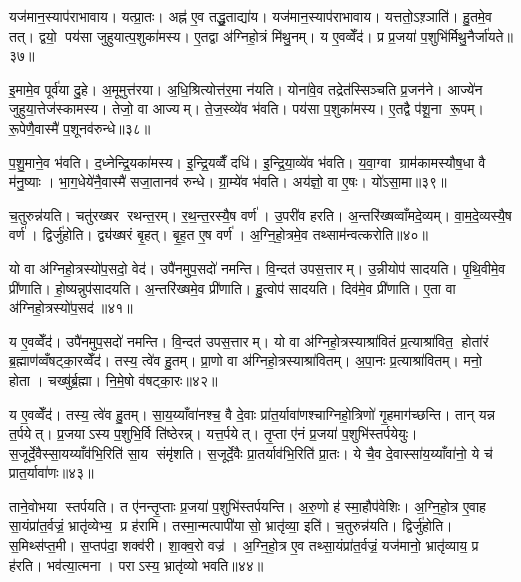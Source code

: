 यज॑मान॒स्याप॑राभावाय। यत्प्रा॒तः। अह्न॑ ए॒व तद्धु॒ताद्या॑य। यज॑मान॒स्याप॑राभावाय। यत्ततो॒ऽश़्ञाति॑। हु॒तमे॒व तत्। द्वयो॒ पय॑सा जुहुयात्प॒शुका॑मस्य। ए॒तद्वा अ॑ग्निहो॒त्रं मि॑थु॒नम्। य ए॒वव्वेँद॑। प्र प्र॒जया॑ प॒शुभि॑र्मिथु॒नैर्जा॑यते॥३७॥

इ॒मामे॒व पूर्व॑या दु॒हे। अ॒मूमुत्त॑रया। अ॒धि॒श्रित्योत्त॑र॒मा न॑यति। योना॑वे॒व तद्रेत॑स्सिञ्चति प्र॒जन॑ने। आज्ये॑न जुहुया॒त्तेज॑स्कामस्य। तेजो॒ वा आज्यम्। ते॒ज॒स्व्ये॑व भ॑वति। पय॑सा प॒शुका॑मस्य। ए॒तद्वै प॑शू॒ना रू॒पम्। रू॒पेणै॒वास्मै॑ प॒शूनव॑रुन्धे॥३८॥

प॒शु॒माने॒व भ॑वति। द॒ध्नेन्द्रि॒यका॑मस्य। इ॒न्द्रि॒यव्वैँ दधि॑। इ॒न्द्रि॒या॒व्ये॑व भ॑वति। य॒वा॒ग्वा ग्राम॑कामस्यौष॒धा वै म॑नु॒ष्याः। भा॒ग॒धेये॑नै॒वास्मै॑ सजा॒तानव॑ रुन्धे। ग्रा॒म्ये॑व भ॑वति। अय॑ज्ञो॒ वा ए॒षः। यो॑ऽसा॒मा॥३९॥

च॒तुरुन्न॑यति। चतु॑रख्षर रथन्त॒रम्। र॒थ॒न्त॒रस्यै॒ष वर्ण॑। उ॒परी॑व हरति। अ॒न्तरि॑ख्षव्वाँमदे॒व्यम्। वा॒म॒दे॒व्यस्यै॒ष वर्ण॑। द्विर्जु॑होति। द्व्य॑ख्षरं बृ॒हत्। बृ॒ह॒त ए॒ष वर्ण॑। अ॒ग्नि॒हो॒त्रमे॒व तथ्साम॑न्वत्करोति॥४०॥

यो वा अ॑ग्निहो॒त्रस्यो॑प॒सदो॒ वेद॑। उपै॑नमुप॒सदो॑ नमन्ति। वि॒न्दत॑ उपस॒त्तारम्। उ॒न्नीयोप॑ सादयति। पृ॒थि॒वीमे॒व प्री॑णाति। हो॒ष्यन्नुप॑सादयति। अ॒न्तरि॑ख्षमे॒व प्री॑णाति। हु॒त्वोप॑ सादयति। दिव॑मे॒व प्री॑णाति। ए॒ता वा अ॑ग्निहो॒त्रस्यो॑प॒सद॑॥४१॥

य ए॒वव्वेँद॑। उपै॑नमुप॒सदो॑ नमन्ति। वि॒न्दत॑ उपस॒त्तारम्। यो वा अ॑ग्निहो॒त्रस्याश्रा॑वितं प्र॒त्याश्रा॑वित॒ होता॑रं ब्र॒ह्माण॑व्वँषट्का॒रव्वेँद॑। तस्य॒ त्वे॑व हु॒तम्। प्रा॒णो वा अ॑ग्निहो॒त्रस्याश्रा॑वितम्। अ॒पा॒नः प्र॒त्याश्रा॑वितम्। मनो॒ होता। चख्षु॑र्ब्र॒ह्मा। नि॒मे॒षो व॑षट्का॒रः॥४२॥

य ए॒वव्वेँद॑। तस्य॒ त्वे॑व हु॒तम्। सा॒य॒य्याँवा॑नश्च॒ वै दे॒वाः प्रा॑त॒र्यावा॑णश्चाग्निहो॒त्रिणो॑ गृ॒हमाग॑च्छन्ति। तान् यन्न त॒र्पयेत्। प्र॒जयाऽस्य प॒शुभि॒र्वि ति॑ष्ठेरन्न्। यत्त॒र्पयेत्। तृ॒प्ता ए॑नं प्र॒जया॑ प॒शुभि॑स्तर्पयेयुः। स॒जूर्दे॒वैस्सा॒यय्याँव॑भि॒रिति॑ सा॒य संमृ॑शति। स॒जूर्दे॒वैः प्रा॒तर्याव॑भि॒रिति॑ प्रा॒तः। ये चै॒व दे॒वास्सा॑य॒य्याँवा॑नो॒ ये च॑ प्रात॒र्यावा॑णः॥४३॥

ताने॒वोभया स्तर्पयति। त ए॑नन्तृ॒प्ताः प्र॒जया॑ प॒शुभि॑स्तर्पयन्ति। अ॒रु॒णो ह॑ स्मा॒हौप॑वेशिः। अ॒ग्नि॒हो॒त्र ए॒वाह सा॒यंप्रा॑त॒र्वज्रं॒ भ्रातृ॑व्येभ्य॒ प्र ह॑रामि। तस्मा॒न्मत्पापी॑यासो॒ भ्रातृ॑व्या॒ इति॑। च॒तुरुन्न॑यति। द्विर्जु॑होति। स॒मिथ्स॑प्त॒मी। स॒प्तप॑दा॒ शक्व॑री। शा॒क्व॒रो वज्र॑। अ॒ग्नि॒हो॒त्र ए॒व तथ्सा॒यंप्रा॑त॒र्वज्रं॒ यज॑मानो॒ भ्रातृ॑व्याय॒ प्र ह॑रति। भव॑त्या॒त्मना। पराऽस्य॒ भ्रातृ॑व्यो भवति॥४४॥

